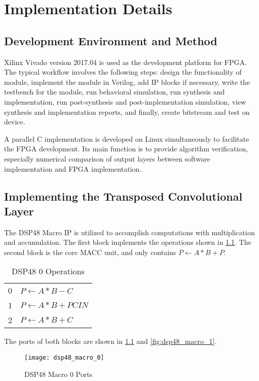 
\chapter{Implementation Details}

\section{Development Environment and Method}

Xilinx Vivado version 2017.04 is used as the development platform for FPGA. The typical workflow involves
the following steps: design the functionality of module, implement the module in Verilog, add IP blocks
if necessary, write the testbench for the module, run behavioral simulation, run synthesis and implementation,
run post-synthesis and post-implementation simulation, view synthesis and implementation reports, and finally,
create bitstream and test on device.

A parallel C implementation is developed on Linux simultaneously to facilitate the FPGA development.
Its main function is to provide algorithm verification, especially numerical comparison of output layers
between software implementation and FPGA implementation.

\section{Implementing the Transposed Convolutional Layer}

The DSP48 Macro IP is utilized to accomplish computations with multiplication and accumulation. The first
block implements the operations shown in \ref{table:dsp48_0_operations}. The second block is the core MACC
unit, and only contains $P \leftarrow A*B+P$.

\begin{table}[h]
  \centering
  \caption{DSP48 0 Operations}
  \begin{tabular}{l | l}
    0 & $P \leftarrow A*B-C$ \\
    1 & $P \leftarrow A*B+PCIN$ \\
    2 & $P \leftarrow A*B+C$
  \end{tabular}
  \label{table:dsp48_0_operations}
\end{table}

The ports of both blocks are shown in \ref{fig:dsp48_macro_0} and \ref{fig:dsp48_macro_1}.

\begin{figure}[h]
  \centering
  \texttt{[image: dsp48\_macro\_0]}
  \caption{DSP48 Macro 0 Ports}
  \label{fig:dsp48_macro_0}
\end{figure}

